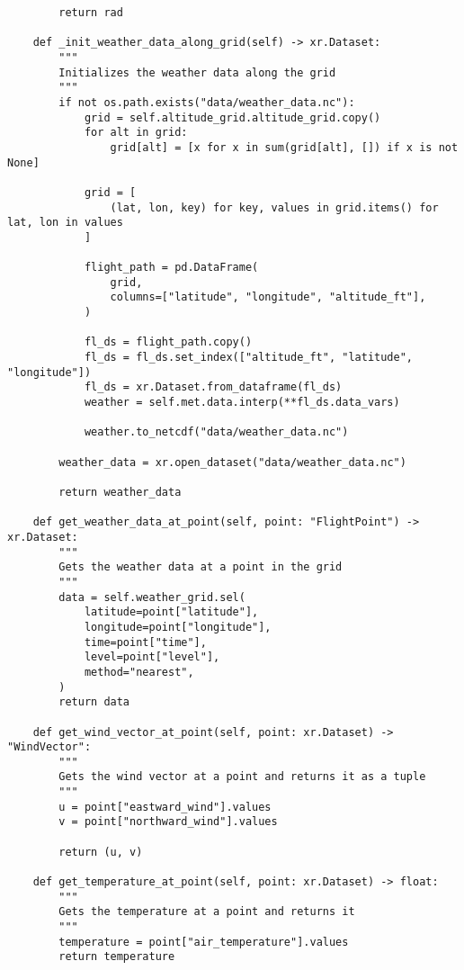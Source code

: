 \begin{verbatim}
        return rad

    def _init_weather_data_along_grid(self) -> xr.Dataset:
        """
        Initializes the weather data along the grid
        """
        if not os.path.exists("data/weather_data.nc"):
            grid = self.altitude_grid.altitude_grid.copy()
            for alt in grid:
                grid[alt] = [x for x in sum(grid[alt], []) if x is not None]

            grid = [
                (lat, lon, key) for key, values in grid.items() for lat, lon in values
            ]

            flight_path = pd.DataFrame(
                grid,
                columns=["latitude", "longitude", "altitude_ft"],
            )

            fl_ds = flight_path.copy()
            fl_ds = fl_ds.set_index(["altitude_ft", "latitude", "longitude"])
            fl_ds = xr.Dataset.from_dataframe(fl_ds)
            weather = self.met.data.interp(**fl_ds.data_vars)

            weather.to_netcdf("data/weather_data.nc")

        weather_data = xr.open_dataset("data/weather_data.nc")

        return weather_data

    def get_weather_data_at_point(self, point: "FlightPoint") -> xr.Dataset:
        """
        Gets the weather data at a point in the grid
        """
        data = self.weather_grid.sel(
            latitude=point["latitude"],
            longitude=point["longitude"],
            time=point["time"],
            level=point["level"],
            method="nearest",
        )
        return data

    def get_wind_vector_at_point(self, point: xr.Dataset) -> "WindVector":
        """
        Gets the wind vector at a point and returns it as a tuple
        """
        u = point["eastward_wind"].values
        v = point["northward_wind"].values

        return (u, v)

    def get_temperature_at_point(self, point: xr.Dataset) -> float:
        """
        Gets the temperature at a point and returns it
        """
        temperature = point["air_temperature"].values
        return temperature

\end{verbatim}
